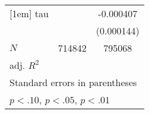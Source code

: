 \begin{table}[htbp]
\begin{tabular}{l*{2}{c}}
[1em]
tau         &                     &   -0.000407\sym{***}\\
            &                     &  (0.000144)         \\
\hline
\(N\)       &      714842         &      795068         \\
adj. \(R^{2}\)&                     &                     \\
\hline\hline
\multicolumn{3}{l}{\footnotesize Standard errors in parentheses}\\
\multicolumn{3}{l}{\footnotesize \sym{*} \(p<.10\), \sym{**} \(p<.05\), \sym{***} \(p<.01\)}\\
\end{tabular}
\end{table}
